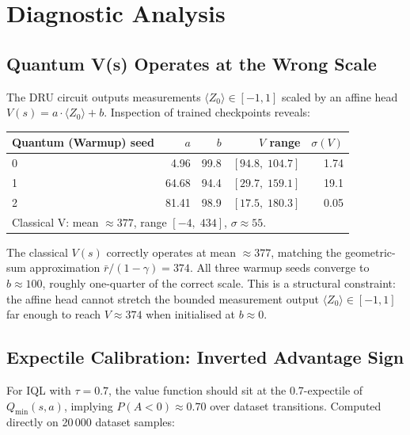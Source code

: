 \documentclass[10pt,a4paper]{article}
\begin{document}
\section{Diagnostic Analysis}

\subsection{Quantum V(s) Operates at the Wrong Scale}
\label{sec:scale}

The DRU circuit outputs measurements $\langle Z_0\rangle\in[-1,1]$ scaled by
an affine head $V(s)=a\cdot\langle Z_0\rangle+b$.
Inspection of trained checkpoints reveals:

\begin{center}
\setlength{\tabcolsep}{9pt}
\begin{tabular}{lrrrr}
\toprule
Quantum (Warmup) seed & $a$ & $b$ & $V$ range & $\sigma(V)$ \\
\midrule
0 &  4.96 &  99.8 & $[94.8,\;104.7]$ & 1.74 \\
1 & 64.68 &  94.4 & $[29.7,\;159.1]$ & 19.1 \\
2 & 81.41 &  98.9 & $[17.5,\;180.3]$ & 0.05 \\
\midrule
\multicolumn{5}{l}{\footnotesize Classical V: mean $\approx377$,
  range $[-4,\;434]$, $\sigma\approx55$.}\\
\bottomrule
\end{tabular}
\end{center}

The classical $V(s)$ correctly operates at mean $\approx377$, matching the
geometric-sum approximation $\bar{r}/(1-\gamma)=374$.
All three warmup seeds converge to $b\approx100$, roughly one-quarter of the
correct scale.
This is a structural constraint: the affine head cannot stretch the bounded
measurement output $\langle Z_0\rangle\in[-1,1]$ far enough to reach
$V\approx374$ when initialised at $b\approx0$.

\subsection{Expectile Calibration: Inverted Advantage Sign}

For IQL with $\tau=0.7$, the value function should sit at the 0.7-expectile
of $Q_{\min}(s,a)$, implying $P(A<0)\approx0.70$ over dataset transitions.
Computed directly on 20\,000 dataset samples:
\end{document}

